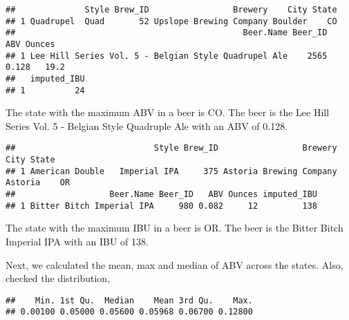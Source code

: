 \documentclass[]{article}
\newenvironment{Shaded}{\begin{snugshade}}{\end{snugshade}}
\newcommand{\CommentTok}[1]{\textcolor[rgb]{0.56,0.35,0.01}{\textit{#1}}}
\newcommand{\KeywordTok}[1]{\textcolor[rgb]{0.13,0.29,0.53}{\textbf{#1}}}
\newcommand{\NormalTok}[1]{#1}
\newcommand{\OperatorTok}[1]{\textcolor[rgb]{0.81,0.36,0.00}{\textbf{#1}}}
\newcommand{\StringTok}[1]{\textcolor[rgb]{0.31,0.60,0.02}{#1}}
\begin{document}
\begin{verbatim}
##              Style Brew_ID                 Brewery    City State
## 1 Quadrupel  Quad       52 Upslope Brewing Company Boulder    CO
##                                              Beer.Name Beer_ID   ABV Ounces
## 1 Lee Hill Series Vol. 5 - Belgian Style Quadrupel Ale    2565 0.128   19.2
##   imputed_IBU
## 1          24
\end{verbatim}

The state with the maximum ABV in a beer is CO. The beer is the Lee Hill
Series Vol. 5 - Belgian Style Quadruple Ale with an ABV of 0.128.

\begin{Shaded}
\end{Shaded}

\begin{verbatim}
##                            Style Brew_ID                 Brewery    City State
## 1 American Double   Imperial IPA     375 Astoria Brewing Company Astoria    OR
##                   Beer.Name Beer_ID   ABV Ounces imputed_IBU
## 1 Bitter Bitch Imperial IPA     980 0.082     12         138
\end{verbatim}

The state with the maximum IBU in a beer is OR. The beer is the Bitter
Bitch Imperial IPA with an IBU of 138.

Next, we calculated the mean, max and median of ABV across the states.
Also, checked the distribution,

\begin{Shaded}
\end{Shaded}

\begin{verbatim}
##    Min. 1st Qu.  Median    Mean 3rd Qu.    Max. 
## 0.00100 0.05000 0.05600 0.05968 0.06700 0.12800
\end{verbatim}
\end{document}
